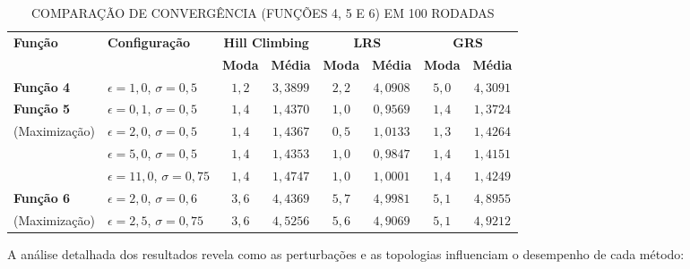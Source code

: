 \documentclass[journal,onecolumn]{IEEEtran}
\begin{document}
\begin{table}[H]
\renewcommand{\arraystretch}{1.2}
\caption{COMPARAÇÃO DE CONVERGÊNCIA (FUNÇÕES 4, 5 E 6) EM 100 RODADAS}
\label{tab:conv_f456}
\centering
\begin{tabular}{llcccccc}
\toprule
\textbf{Função} & \textbf{Configuração} & \multicolumn{2}{c}{\textbf{Hill Climbing}} & \multicolumn{2}{c}{\textbf{LRS}} & \multicolumn{2}{c}{\textbf{GRS}} \\
\cmidrule(lr){3-4} \cmidrule(lr){5-6} \cmidrule(lr){7-8}
& & \textbf{Moda} & \textbf{Média} & \textbf{Moda} & \textbf{Média} & \textbf{Moda} & \textbf{Média} \\
\midrule
\textbf{Função 4} & $\epsilon=1{,}0$, $\sigma=0{,}5$ & $1{,}2$ & $3{,}3899$ & $2{,}2$ & $4{,}0908$ & $5{,}0$ & $4{,}3091$ \\
\midrule
\textbf{Função 5} & $\epsilon=0{,}1$, $\sigma=0{,}5$ & $1{,}4$ & $1{,}4370$ & $1{,}0$ & $0{,}9569$ & $1{,}4$ & $1{,}3724$ \\
(Maximização) & $\epsilon=2{,}0$, $\sigma=0{,}5$ & $1{,}4$ & $1{,}4367$ & $0{,}5$ & $1{,}0133$ & $1{,}3$ & $1{,}4264$ \\
& $\epsilon=5{,}0$, $\sigma=0{,}5$ & $1{,}4$ & $1{,}4353$ & $1{,}0$ & $0{,}9847$ & $1{,}4$ & $1{,}4151$ \\
& $\epsilon=11{,}0$, $\sigma=0{,}75$ & $1{,}4$ & $1{,}4747$ & $1{,}0$ & $1{,}0001$ & $1{,}4$ & $1{,}4249$ \\
\midrule
\textbf{Função 6} & $\epsilon=2{,}0$, $\sigma=0{,}6$ & $3{,}6$ & $4{,}4369$ & $5{,}7$ & $4{,}9981$ & $5{,}1$ & $4{,}8955$ \\
(Maximização) & $\epsilon=2{,}5$, $\sigma=0{,}75$ & $3{,}6$ & $4{,}5256$ & $5{,}6$ & $4{,}9069$ & $5{,}1$ & $4{,}9212$ \\
\bottomrule
\end{tabular}
\end{table}

A análise detalhada dos resultados revela como as perturbações e as topologias influenciam o desempenho de cada método:
\end{document}
